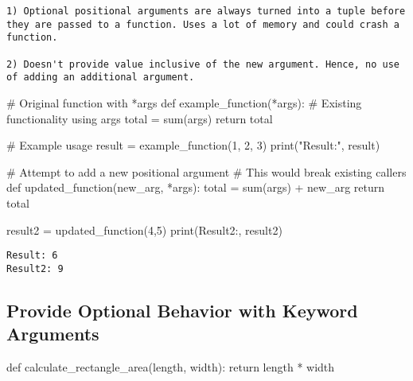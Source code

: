 \documentclass[
]{report}
\newenvironment{Shaded}{\begin{snugshade}}{\end{snugshade}}
\newcommand{\BuiltInTok}[1]{\textcolor[rgb]{0.00,0.23,0.31}{#1}}
\newcommand{\CommentTok}[1]{\textcolor[rgb]{0.37,0.37,0.37}{#1}}
\newcommand{\ControlFlowTok}[1]{\textcolor[rgb]{0.00,0.23,0.31}{#1}}
\newcommand{\DecValTok}[1]{\textcolor[rgb]{0.68,0.00,0.00}{#1}}
\newcommand{\KeywordTok}[1]{\textcolor[rgb]{0.00,0.23,0.31}{#1}}
\newcommand{\NormalTok}[1]{\textcolor[rgb]{0.00,0.23,0.31}{#1}}
\newcommand{\OperatorTok}[1]{\textcolor[rgb]{0.37,0.37,0.37}{#1}}
\newcommand{\StringTok}[1]{\textcolor[rgb]{0.13,0.47,0.30}{#1}}
\begin{document}
\begin{verbatim}
1) Optional positional arguments are always turned into a tuple before they are passed to a function. Uses a lot of memory and could crash a function.

2) Doesn't provide value inclusive of the new argument. Hence, no use of adding an additional argument. 
\end{verbatim}

\begin{Shaded}
\begin{Highlighting}[]
\CommentTok{\# Original function with *args}
\KeywordTok{def}\NormalTok{ example\_function(}\OperatorTok{*}\NormalTok{args):}
    \CommentTok{\# Existing functionality using args}
\NormalTok{    total }\OperatorTok{=} \BuiltInTok{sum}\NormalTok{(args)}
    \ControlFlowTok{return}\NormalTok{ total}

\CommentTok{\# Example usage}
\NormalTok{result }\OperatorTok{=}\NormalTok{ example\_function(}\DecValTok{1}\NormalTok{, }\DecValTok{2}\NormalTok{, }\DecValTok{3}\NormalTok{)}
\BuiltInTok{print}\NormalTok{(}\StringTok{"Result:"}\NormalTok{, result)}

\CommentTok{\# Attempt to add a new positional argument}
\CommentTok{\# This would break existing callers}
\KeywordTok{def}\NormalTok{ updated\_function(new\_arg, }\OperatorTok{*}\NormalTok{args):}
\NormalTok{     total }\OperatorTok{=} \BuiltInTok{sum}\NormalTok{(args) }\OperatorTok{+}\NormalTok{ new\_arg}
     \ControlFlowTok{return}\NormalTok{ total}

\NormalTok{result2 }\OperatorTok{=}\NormalTok{ updated\_function(}\DecValTok{4}\NormalTok{,}\DecValTok{5}\NormalTok{)}
\BuiltInTok{print}\NormalTok{(}\StringTok{\textquotesingle{}Result2:\textquotesingle{}}\NormalTok{, result2)}
\end{Highlighting}
\end{Shaded}

\begin{verbatim}
Result: 6
Result2: 9
\end{verbatim}

\hypertarget{provide-optional-behavior-with-keyword-arguments}{%
\subsection{Provide Optional Behavior with Keyword
Arguments}\label{provide-optional-behavior-with-keyword-arguments}}

\begin{Shaded}
\begin{Highlighting}[]
\KeywordTok{def}\NormalTok{ calculate\_rectangle\_area(length, width):}
    \ControlFlowTok{return}\NormalTok{ length }\OperatorTok{*}\NormalTok{ width}
\end{Highlighting}
\end{Shaded}
\end{document}
